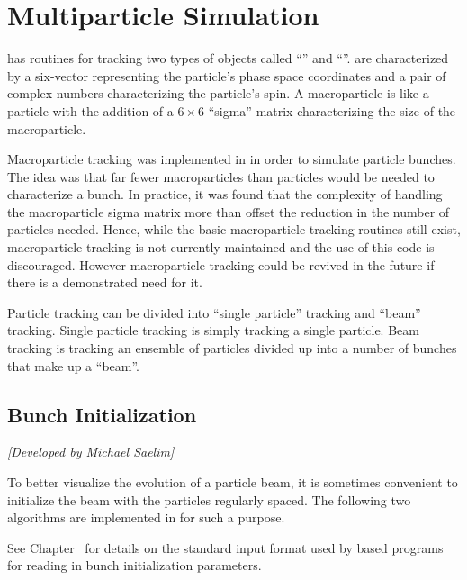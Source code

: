 \chapter{Multiparticle Simulation}
\label{c:multi.sim}

\bmad has routines for tracking two types of objects called ``'' and
``''.  are characterized by a six-vector representing the
particle's phase space coordinates and a pair of complex numbers characterizing the particle's spin.
A macroparticle is like a particle with the addition of a $6\times 6$ ``sigma'' matrix
characterizing the size of the macroparticle.

Macroparticle tracking was implemented in \bmad in order to simulate particle bunches.  The idea was
that far fewer macroparticles than particles would be needed to characterize a bunch. In practice,
it was found that the complexity of handling the macroparticle sigma matrix more than offset the
reduction in the number of particles needed. Hence, while the basic macroparticle tracking routines
still exist, macroparticle tracking is not currently maintained and the use of this code is
discouraged. However macroparticle tracking could be revived in the future if there is a
demonstrated need for it.

Particle tracking can be divided into ``single particle'' tracking and ``beam'' tracking. Single
particle tracking is simply tracking a single particle. Beam tracking is tracking an ensemble of
particles divided up into a number of bunches that make up a ``beam''.

\section{Bunch Initialization}
\label{s:bunch.init}

\textit{[Developed by Michael Saelim]}

To better visualize the evolution of a particle beam, it is sometimes convenient to initialize the
beam with the particles regularly spaced. The following two algorithms are implemented in \bmad for
such a purpose.

See Chapter~ for details on the standard input format used by \bmad based programs for
reading in bunch initialization parameters.

